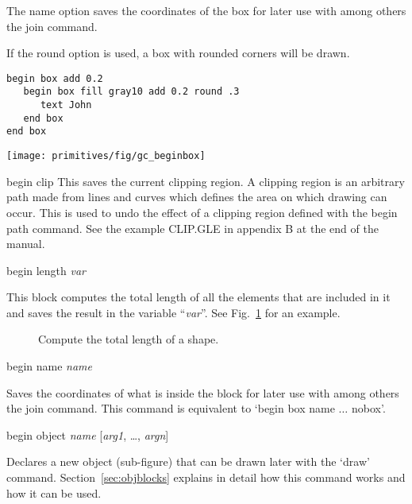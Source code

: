 \begin{commanddescription}
The {\sf name} option saves the coordinates of the box for later use
with among others the {\sf join} command.

If the {\sf round} option is used, a box with rounded corners will be drawn.

\begin{minipage}[c]{8cm}
\begin{Verbatim}
begin box add 0.2
   begin box fill gray10 add 0.2 round .3
      text John
   end box
end box
\end{Verbatim}
\end{minipage}
\hfill
\begin{minipage}[c]{7cm}
\mbox{\texttt{[image: primitives/fig/gc\_beginbox]}}
\end{minipage}

\item[{\sf begin clip }]
This saves the current clipping region.
A clipping region is an arbitrary path made from lines and curves
which defines the area on which drawing can occur.
This is used to undo the
effect of a clipping region defined with the begin path command.
See the example CLIP.GLE in appendix B at the end of the manual.

\item[{\sf begin length {\it var}}]

This block computes the total length of all the elements that are included in it and saves the result in the variable ``{\it var}''. See Fig.~\ref{beginlen:fig} for an example.

\begin{figure}[tb]
\centering
\mbox{}
\caption{\label{beginlen:fig}Compute the total length of a shape.}
\end{figure}

\item[{\sf begin name {\it name}}]
\label{cmd:beginname}

Saves the coordinates of what is inside the block for later use with among others the {\sf join} command. This command is equivalent to `{\sf begin box name} $\ldots$ {\sf nobox}'.

\item[{\sf begin object {\it name} [{\it arg1}, \ldots, {\it argn}]}]
\label{cmd:beginobject}

Declares a new object (sub-figure) that can be drawn later with the `{\sf draw}' command. Section~\ref{sec:objblocks} explains in detail how this command works and how it can be used.


\end{commanddescription}
